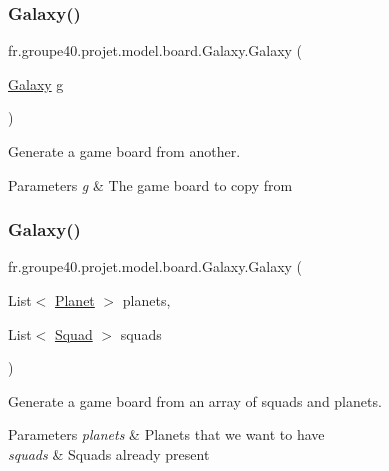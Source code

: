 \subsubsection{\texorpdfstring{Galaxy()}{Galaxy()}\hspace{0.1cm}{\footnotesize\ttfamily [1/2]}}
{\footnotesize\ttfamily fr.\+groupe40.\+projet.\+model.\+board.\+Galaxy.\+Galaxy (\begin{DoxyParamCaption}\item[{\hyperlink{classfr_1_1groupe40_1_1projet_1_1model_1_1board_1_1_galaxy}{Galaxy}}]{g }\end{DoxyParamCaption})}



Generate a game board from another. 


\begin{DoxyParams}{Parameters}
{\em g} & The game board to copy from \\
\hline
\end{DoxyParams}
\mbox{\label{classfr_1_1groupe40_1_1projet_1_1model_1_1board_1_1_galaxy_ab214654e58ccf7bc40216d177cde0479}} 
\subsubsection{\texorpdfstring{Galaxy()}{Galaxy()}\hspace{0.1cm}{\footnotesize\ttfamily [2/2]}}
{\footnotesize\ttfamily fr.\+groupe40.\+projet.\+model.\+board.\+Galaxy.\+Galaxy (\begin{DoxyParamCaption}\item[{List$<$ \hyperlink{classfr_1_1groupe40_1_1projet_1_1model_1_1planets_1_1_planet}{Planet} $>$}]{planets,  }\item[{List$<$ \hyperlink{classfr_1_1groupe40_1_1projet_1_1model_1_1ships_1_1_squad}{Squad} $>$}]{squads }\end{DoxyParamCaption})}



Generate a game board from an array of squads and planets. 


\begin{DoxyParams}{Parameters}
{\em planets} & Planets that we want to have \\
\hline
{\em squads} & Squads already present \\
\hline
\end{DoxyParams}


